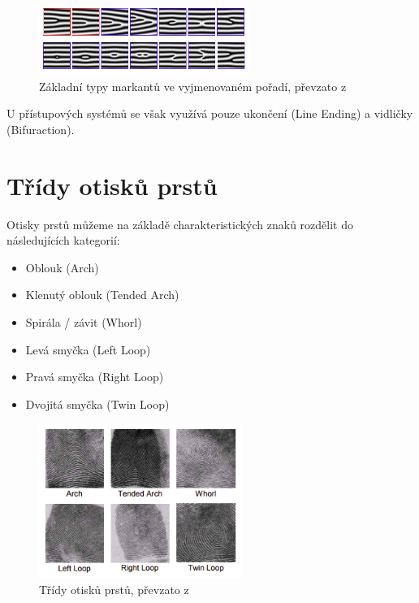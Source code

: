 \begin{figure}[!htbp]
    \centering
    \includegraphics[width=260px]{obrazky-figures/markants.png}
    \caption{Základní typy markantů ve vyjmenovaném pořadí, převzato z \cite{Drahansky}}
\end{figure}

U přístupových systémů se však využívá pouze ukončení (Line Ending) a vidličky (Bifuraction).\cite{Drahansky}

\section{Třídy otisků prstů}
Otisky prstů můžeme na základě charakteristických znaků rozdělit do následujících kategorií:\cite{Drahansky}
\begin{itemize}
    \item Oblouk (Arch)
    \item Klenutý oblouk (Tended Arch)
    \item Spirála / závit (Whorl)
    \item Levá smyčka (Left Loop)
    \item Pravá smyčka (Right Loop)
    \item Dvojitá smyčka (Twin Loop)
\end{itemize}

\begin{figure}[!htbp]
    \centering
    \includegraphics[width=250px]{obrazky-figures/classes.png}
    \caption{Třídy otisků prstů, převzato z \cite{Drahansky}}
\end{figure}

